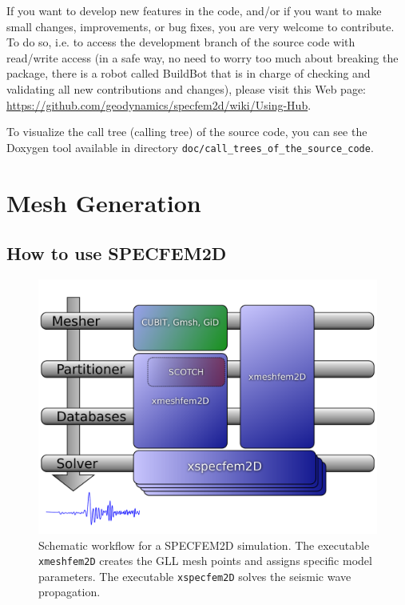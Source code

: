 \documentclass[oneside,english,onecolumn,letterpaper]{book}
\begin{document}
If you want to develop new features in the code, and/or if you want to make small changes, improvements, or bug fixes, you are very welcome to contribute. To do so, i.e. to access the development branch of the source code with read/write access (in a safe way, no need to worry too much about breaking the package, there is a robot called BuildBot that is in charge of checking and validating all new contributions and changes), please visit this Web page: \url{https://github.com/geodynamics/specfem2d/wiki/Using-Hub}.

To visualize the call tree (calling tree) of the source code, you can see the Doxygen tool available in directory \texttt{doc/call\_trees\_of\_the\_source\_code}.


\chapter{Mesh Generation}


\section{How to use SPECFEM2D}

\begin{figure}[htbp]
\centering
\includegraphics[width=.6\textwidth]{figures/workflow}

\caption{Schematic workflow for a SPECFEM2D simulation. The executable \texttt{xmeshfem2D} creates the GLL mesh points and assigns specific model parameters. The executable \texttt{xspecfem2D} solves the seismic wave propagation.}

\label{fig:workflow.databases}
\end{figure}
\end{document}
